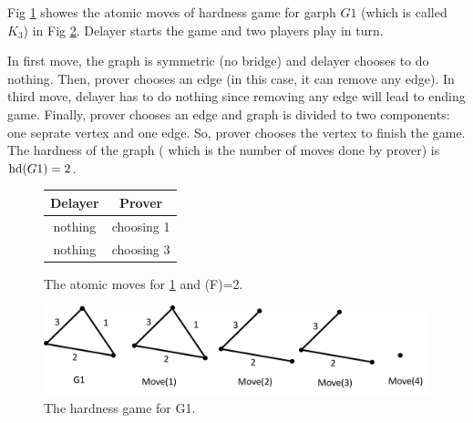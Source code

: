 \documentclass[12pt]{book}
\begin{document}
\begin{examp}\label{exp:hd1}
       Fig \ref{fig:game1} showes the atomic moves of hardness game for garph $G1$ (which is called $K_3$) in Fig \ref{fig:hd1}. Delayer starts the game and two 
	   players play in turn. 
	   
	   In first move, the graph is symmetric (no bridge) and delayer chooses to do nothing. Then, prover chooses an edge (in this case, it can remove any edge). 
	   In third move, delayer has to do nothing since removing any edge will lead to ending game. Finally, prover chooses an edge and graph is divided to two components: 
	   one seprate vertex and one edge. So, prover chooses the vertex to finish the game. The hardness of the graph ( which is the number of moves done by prover) is $\operatorname{hd}(G1)=2$.
	   
	   \begin{figure}[h]
       \centering
       \begin{tabular}{|c|c|} 
                  \hline
                  Delayer & Prover \\ \hline
                  nothing & choosing 1  \\ \hline
                  nothing & choosing 3  \\ \hline
       \end{tabular}
       \caption{The atomic moves for \ref{fig:game1} and \hardness(F)=2.}
       \label{fig:game1}
      \end{figure}
	  \begin{figure}
      \begin{center}
      \includegraphics[scale =0.6]{g1.png}
      \caption{The hardness game for G1.}
	  \label{fig:hd1}
      \end{center}
      \end{figure}
\end{examp}
\end{document}
